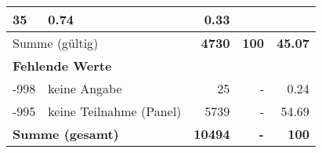 \begin{longtable}{lXrrr}
       \num{35} &
       \num[round-mode=places,round-precision=2]{0.74} &
         \num[round-mode=places,round-precision=2]{0.33} \\
     \midrule
     \multicolumn{2}{l}{Summe (gültig)} &
       \textbf{\num{4730}} &
     \textbf{\num{100}} &
       \textbf{\num[round-mode=places,round-precision=2]{45.07}} \\
     \multicolumn{5}{l}{\textbf{Fehlende Werte}}\\
       -998 &
       keine Angabe &
         \num{25} &
        - &
         \num[round-mode=places,round-precision=2]{0.24} \\
       -995 &
       keine Teilnahme (Panel) &
         \num{5739} &
        - &
         \num[round-mode=places,round-precision=2]{54.69} \\
     \midrule
     \multicolumn{2}{l}{\textbf{Summe (gesamt)}} &
          \textbf{\num{10494}} &
        \textbf{-} &
        \textbf{\num{100}} \\
     \bottomrule
     \end{longtable}
     
